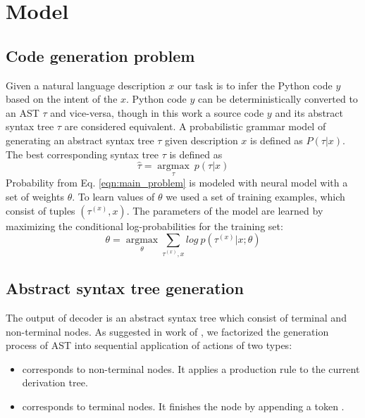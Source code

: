 \chapter{Model} 
\label{Chapter4}

\section{Code generation problem}
Given a natural language description $x$ our task is to infer the Python code $y$ based on the intent of the $x$. Python code $y$ can be deterministically converted to an AST $\tau$ and vice-versa, though in this work a source code $y$ and its abstract syntax tree $\tau$ are considered equivalent. A probabilistic grammar model of generating an abstract syntax tree $\tau$ given description $x$ is defined as $P(\tau|x)$. The best corresponding syntax tree $\tau$ is defined as
\begin{equation}
\hat{\tau}=\underset{\tau}{\operatorname{argmax}}\: p(\tau|x)
\label{eqn:main_problem}
\end{equation}
Probability from Eq. \ref{eqn:main_problem} is modeled with neural model with a set of weights $\theta$. To learn values of $\theta$ we used a set of training examples, which consist of tuples $(\tau^{(x)}, x)$. The parameters of the model are learned by maximizing the conditional log-probabilities for the training set:
\begin{equation}
\theta=\underset{\theta}{\operatorname{argmax}} \sum_{\tau^{(x)}, x} log \: p(\tau^{(x)}|x; \theta)
\label{eqn:mle}
\end{equation}

\section{Abstract syntax tree generation} \label{ast_gen}
The output of decoder is an abstract syntax tree which consist of terminal and non-terminal nodes. As suggested in work of \cite{Yin2017}, we factorized the generation process of AST into sequential application of actions of two types:
\begin{itemize}
	\item {} corresponds to non-terminal nodes. It applies a production rule  to the current derivation tree.
	\item {} corresponds to terminal nodes. It finishes the node by appending a token .
\end{itemize}

